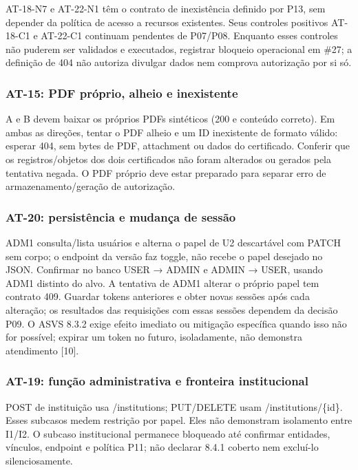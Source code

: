 AT-18-N7 e AT-22-N1 têm o contrato de inexistência definido por P13, sem
depender da política de acesso a recursos existentes. Seus controles
positivos AT-18-C1 e AT-22-C1 continuam pendentes de P07/P08. Enquanto
esses controles não puderem ser validados e executados, registrar
bloqueio operacional em \#27; a definição de 404 não autoriza divulgar
dados nem comprova autorização por si só.

\subsubsection{AT-15: PDF próprio, alheio e
inexistente}\label{at-15-pdf-pruxf3prio-alheio-e-inexistente}

A e B devem baixar os próprios PDFs sintéticos (200 e conteúdo correto).
Em ambas as direções, tentar o PDF alheio e um ID inexistente de formato
válido: esperar 404, sem bytes de PDF, attachment ou dados do
certificado. Conferir que os registros/\allowbreak{}objetos dos dois certificados não
foram alterados ou gerados pela tentativa negada. O PDF próprio deve
estar preparado para separar erro de armazenamento/\allowbreak{}geração de
autorização.

\subsubsection{AT-20: persistência e mudança de
sessão}\label{at-20-persistuxeancia-e-mudanuxe7a-de-sessuxe3o}

ADM1 consulta/\allowbreak{}lista usuários e alterna o papel de U2 descartável com
PATCH sem corpo; o endpoint da versão faz toggle, não recebe o papel
desejado no JSON. Confirmar no banco USER → ADMIN e ADMIN → USER, usando
ADM1 distinto do alvo. A tentativa de ADM1 alterar o próprio papel tem
contrato 409. Guardar tokens anteriores e obter novas sessões após cada
alteração; os resultados das requisições com essas sessões dependem da
decisão P09. O ASVS 8.3.2 exige efeito imediato ou mitigação específica
quando isso não for possível; expirar um token no futuro, isoladamente,
não demonstra atendimento {[}10{]}.

\subsubsection{AT-19: função administrativa e fronteira
institucional}\label{at-19-funuxe7uxe3o-administrativa-e-fronteira-institucional}

POST de instituição usa /institutions; PUT/\allowbreak{}DELETE usam
/institutions/\{id\}. Esses subcasos medem restrição por papel. Eles não
demonstram isolamento entre I1/I2. O subcaso institucional permanece
bloqueado até confirmar entidades, vínculos, endpoint e política P11;
não declarar 8.4.1 coberto nem excluí-lo silenciosamente.

